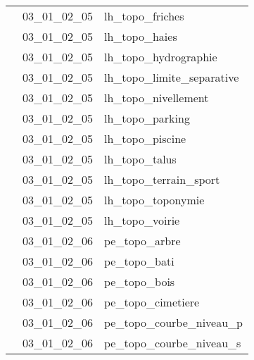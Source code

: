 \documentclass[12pt,titlepage,oneside]{book}
\begin{document}
\begin{supertabular}{|p{10cm}|c|p{15cm}|}
                    & 03\_01\_02\_05 & lh\_topo\_friches\\


                    & 03\_01\_02\_05 & lh\_topo\_haies\\


                    & 03\_01\_02\_05 & lh\_topo\_hydrographie\\


                    & 03\_01\_02\_05 & lh\_topo\_limite\_separative\\


                    & 03\_01\_02\_05 & lh\_topo\_nivellement\\


                    & 03\_01\_02\_05 & lh\_topo\_parking\\


                    & 03\_01\_02\_05 & lh\_topo\_piscine\\


                    & 03\_01\_02\_05 & lh\_topo\_talus\\


                    & 03\_01\_02\_05 & lh\_topo\_terrain\_sport\\


                    & 03\_01\_02\_05 & lh\_topo\_toponymie\\


                    & 03\_01\_02\_05 & lh\_topo\_voirie\\


                    & 03\_01\_02\_06 & pe\_topo\_arbre\\


                    & 03\_01\_02\_06 & pe\_topo\_bati\\


                    & 03\_01\_02\_06 & pe\_topo\_bois\\


                    & 03\_01\_02\_06 & pe\_topo\_cimetiere\\


                    & 03\_01\_02\_06 & pe\_topo\_courbe\_niveau\_p\\


                    & 03\_01\_02\_06 & pe\_topo\_courbe\_niveau\_s\\



\end{supertabular}
\end{document}
